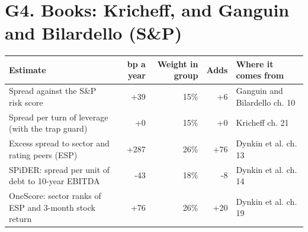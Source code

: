 \documentclass[11pt,a4paper]{article}
\begin{document}
\section*{G4. Books: Kricheff, and Ganguin and Bilardello (S\&P)}
\par\noindent{}
\begin{center}\footnotesize\setlength{\tabcolsep}{3.5pt}\begin{tabular}{@{}p{6.2cm}rrrp{4.2cm}@{}}\toprule
Estimate & bp a year & Weight in group & Adds & Where it comes from \\\midrule
Spread against the S\&P risk score & +39 & 15\% & +6 & Ganguin and Bilardello ch. 10 \\
Spread per turn of leverage (with the trap guard) & +0 & 15\% & +0 & Kricheff ch. 21 \\
Excess spread to sector and rating peers (ESP) & +287 & 26\% & +76 & Dynkin et al. ch. 13 \\
SPiDER: spread per unit of debt to 10-year EBITDA & -43 & 18\% & -8 & Dynkin et al. ch. 14 \\
OneScore: sector ranks of ESP and 3-month stock return & +76 & 26\% & +20 & Dynkin et al. ch. 19 \\
\bottomrule\end{tabular}\end{center}
\end{document}
